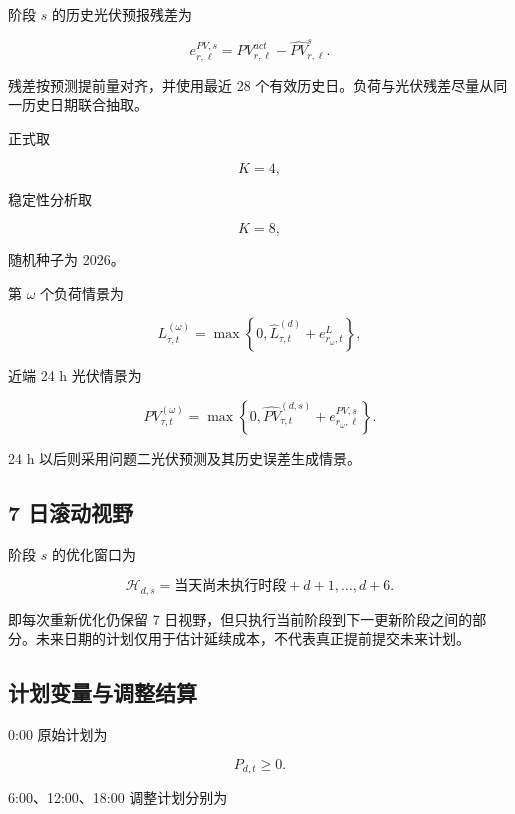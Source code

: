 阶段 \(s\) 的历史光伏预报残差为

\begin{equation}
e^{PV,s}_{r,\ell}
=
PV^{act}_{r,\ell}
-
\widehat{PV}^{s}_{r,\ell}.
\end{equation}

残差按预测提前量对齐，并使用最近 28 个有效历史日。负荷与光伏残差尽量从同一历史日期联合抽取。

正式取

\[
K=4,
\]

稳定性分析取

\[
K=8,
\]

随机种子为 2026。

第 \(\omega\) 个负荷情景为

\begin{equation}
L^{(\omega)}_{\tau,t}
=
\max
\left\{
0,
\hat L^{(d)}_{\tau,t}
+
e^L_{r_\omega,t}
\right\},
\end{equation}

近端 24 h 光伏情景为

\begin{equation}
PV^{(\omega)}_{\tau,t}
=
\max
\left\{
0,
\widehat{PV}^{(d,s)}_{\tau,t}
+
e^{PV,s}_{r_\omega,\ell}
\right\}.
\end{equation}

24 h 以后则采用问题二光伏预测及其历史误差生成情景。

\subsection{7 日滚动视野}

阶段 \(s\) 的优化窗口为

\begin{equation}
\mathcal H_{d,s}
=
\text{当天尚未执行时段}
+
d+1,\ldots,d+6.
\end{equation}

即每次重新优化仍保留 7 日视野，但只执行当前阶段到下一更新阶段之间的部分。未来日期的计划仅用于估计延续成本，不代表真正提前提交未来计划。

\subsection{计划变量与调整结算}

0:00 原始计划为

\begin{equation}
P_{d,t}\ge0.
\end{equation}

6:00、12:00、18:00 调整计划分别为

